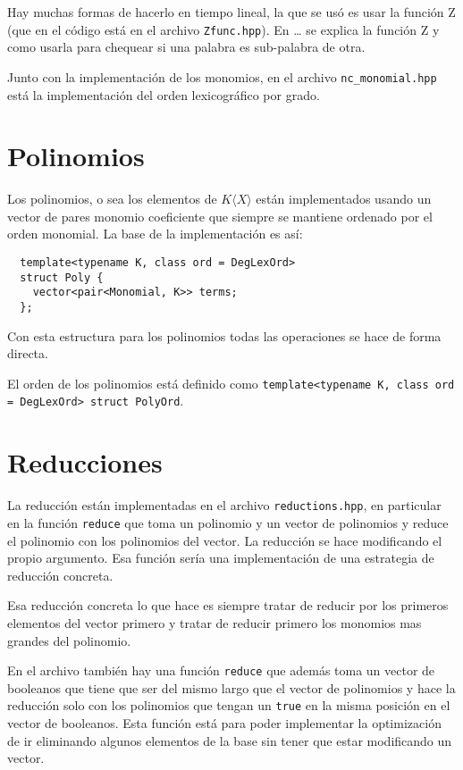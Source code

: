 \documentclass{report}
\theoremstyle{customstyle}
\theoremstyle{factstyle}
\begin{document}
Hay muchas formas de hacerlo en tiempo lineal, la que se usó es usar la función Z (que en el código está en el archivo \texttt{Zfunc.hpp}). En … %
se explica la función Z y como usarla para chequear si una palabra es sub-palabra de otra.

Junto con la implementación de los monomios, en el archivo \texttt{nc\_monomial.hpp} está la implementación del orden lexicográfico por grado.

\section{Polinomios}

Los polinomios, o sea los elementos de $K⟨X⟩$ están implementados usando un vector de pares monomio coeficiente que siempre se mantiene ordenado por el orden monomial. La base de la implementación es así:

\begin{verbatim}
  template<typename K, class ord = DegLexOrd>
  struct Poly {
    vector<pair<Monomial, K>> terms;
  };
\end{verbatim}

Con esta estructura para los polinomios todas las operaciones se hace de forma directa.

El orden de los polinomios está definido como \texttt{template<typename K, class ord = DegLexOrd> struct PolyOrd}.

\section{Reducciones}

La reducción están implementadas en el archivo \texttt{reductions.hpp}, en particular en la función \texttt{reduce} que toma un polinomio y un vector de polinomios y reduce el polinomio con los polinomios del vector. La reducción se hace modificando el propio argumento. Esa función sería una implementación de una estrategia de reducción concreta.

Esa reducción concreta lo que hace es siempre tratar de reducir por los primeros elementos del vector primero y tratar de reducir primero los monomios mas grandes del polinomio.

En el archivo también hay una función \texttt{reduce} que además toma un vector de booleanos que tiene que ser del mismo largo que el vector de polinomios y hace la reducción solo con los polinomios que tengan un \texttt{true} en la misma posición en el vector de booleanos. Esta función está para poder implementar la optimización de ir eliminando algunos elementos de la base sin tener que estar modificando un vector.
\end{document}
